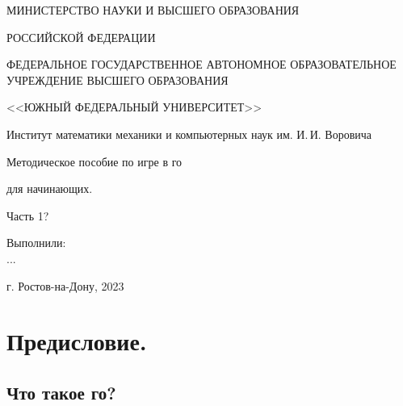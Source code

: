 \documentclass[14pt,a4paper]{extarticle}
\begin{document}
\thispagestyle{empty}
\begin{center}
\small{МИНИСТЕРСТВО НАУКИ И ВЫСШЕГО ОБРАЗОВАНИЯ}\par
\small{РОССИЙСКОЙ ФЕДЕРАЦИИ}\par
\small{ФЕДЕРАЛЬНОЕ ГОСУДАРСТВЕННОЕ АВТОНОМНОЕ ОБРАЗОВАТЕЛЬНОЕ УЧРЕЖДЕНИЕ ВЫСШЕГО ОБРАЗОВАНИЯ}\par
\small{<<ЮЖНЫЙ ФЕДЕРАЛЬНЫЙ УНИВЕРСИТЕТ>>}\par
\normalsize{Институт математики механики и компьютерных наук им. И.\,И. Воровича}\par
\end{center}


\vspace*{5.0em plus 0.2em minus 0.2em}

\begin{center}
Методическое пособие по игре в го
\end{center}

\begin{center}
для начинающих.
\end{center}

\begin{center}
Часть 1?
\end{center}

\vspace*{5.0em plus 0.2em minus 0.2em}
\begin{flushright}
 Выполнили:\\
	...
\end{flushright}






\vspace*{\fill}

\begin{center}
г. Ростов-на-Дону, 2023
\end{center}

\newpage
\thispagestyle{empty}
\tableofcontents


\newpage

\section*{Предисловие.}

\subsection*{Что такое го?}
\
\end{document}
